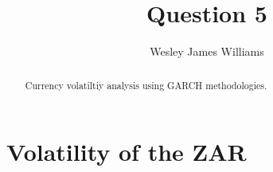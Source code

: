 \documentclass[12pt,preprint, authoryear]{elsarticle}
\numberwithin{equation}{section}
\numberwithin{figure}{section}
\numberwithin{table}{section}
\begin{document}
\begin{frontmatter}  %

\title{Question 5}





\author[Add1]{Wesley James Williams}





\address[Add1]{Stellenbosch University, South Africa}


\begin{abstract}
\small{
Currency volatiltiy analysis using GARCH methodologies.
}
\end{abstract}

\vspace{1cm}





\vspace{0.5cm}

\end{frontmatter}

\setcounter{footnote}{0}



\pagestyle{fancy}
\chead{}
\rhead{}
\lfoot{}
\lhead{}
\cfoot{}


\headsep 35pt %




\hypertarget{volatility-of-the-zar}{%
\section{Volatility of the ZAR}\label{volatility-of-the-zar}}
\end{document}
